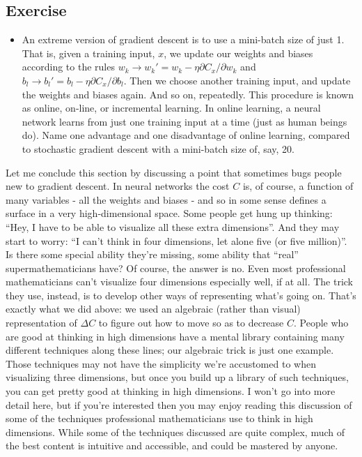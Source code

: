 \documentclass[a4paper,twoside,10pt]{book}
\begin{document}
\subsection*{Exercise}
\begin{itemize}
	\item An extreme version of gradient descent is to use a mini-batch size of just 1. That is, given a training input, $x$, we update our weights and biases according to the rules $w_k \to w_k' = w_k - \eta \partial C_x / \partial w_k$ and $b_l \to b_l' =	b_l - \eta \partial C_x / \partial b_l$. Then we choose another training input, and update the weights and biases again. And so on, repeatedly. This procedure is known as online, on-line, or incremental learning. In online learning, a neural network learns from just one training input at a time (just as human beings do). Name one advantage and one disadvantage of online learning, compared to stochastic gradient descent with a mini-batch size of, say, 20.
\end{itemize}

Let me conclude this section by discussing a point that sometimes bugs people new to gradient descent. In neural networks the cost $C$ is, of course, a function of many variables - all the weights and biases - and so in some sense defines a surface in a very high-dimensional space. Some people get hung up thinking: ``Hey, I have to be able to visualize all these extra dimensions''. And they may start to worry: ``I can't think in four dimensions, let alone five (or five million)''. Is there some special ability they're missing, some ability that ``real'' supermathematicians have? Of course, the answer is no. Even most professional mathematicians can't visualize four dimensions especially well, if at all. The trick they use, instead, is to develop other ways of representing what's going on. That's exactly what we did above: we used an algebraic (rather than visual) representation of $\Delta C$ to figure out how to move so as to decrease $C$. People who are good at thinking in high dimensions have a mental library containing many different techniques along these lines; our algebraic trick is just one example. Those techniques may not have the simplicity we're accustomed to when visualizing three dimensions, but once you build up a library of such techniques, you can get pretty good at thinking in high dimensions. I won't go into more detail here, but if you're interested then you may enjoy reading this discussion of some of the techniques professional mathematicians use to think in high dimensions. While some of the techniques discussed are quite complex, much of the best content is intuitive and accessible, and could be mastered by anyone.
\end{document}

